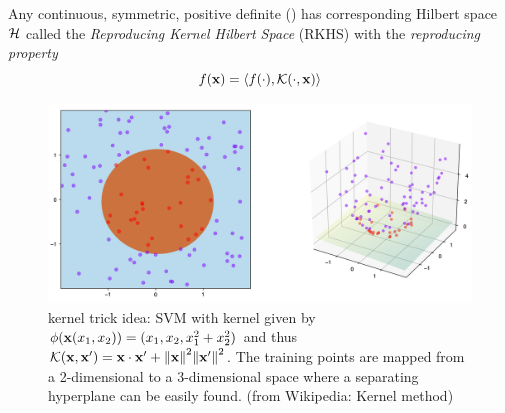 \begin{definition}[Informal]\label{def:rkhs}
	Any continuous, symmetric, positive definite () has corresponding Hilbert space $\mathcal{H}$ 
	called the \emph{Reproducing Kernel Hilbert Space} (RKHS) with the \emph{reproducing property}
	\begin{equation}
		f(\vb{x}) = \expval{f(\cdot),\mathcal{K}(\cdot,\vb{x})}
	\end{equation}
\end{definition}
\begin{figure}[!ht]
	\centering
	\includegraphics[width=0.6\linewidth]{Kernel_trick_idea.png}
	\caption{kernel trick idea: SVM with kernel given by $\phi(\vb{x}(x_1, x_2)) = (x_1, x_2, x_1^2 + x_2^2)$ and thus $\mathcal{K}(\vb{x},\vb{x}')=\vb{x}\cdot \vb{x}' + \norm{\vb{x}}^2 \norm{\vb{x}'}^2$. The training points are mapped from a 2-dimensional to a 3-dimensional space where a separating hyperplane can be easily found. (from Wikipedia: Kernel method)}
	\label{fig:kernel}
\end{figure}
